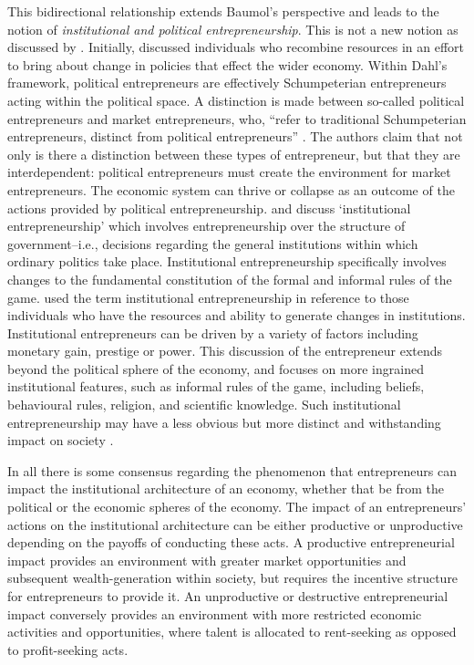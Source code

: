 This bidirectional relationship extends Baumol's perspective and leads to the notion of \emph{institutional and political entrepreneurship}. This is not a new notion as discussed by \citet{BoettkeCoyne2009}. Initially, \citet{Dahl1961} discussed individuals who recombine resources in an effort to bring about change in policies that effect the wider economy. Within Dahl's framework, political entrepreneurs are effectively Schumpeterian entrepreneurs acting within the political space. A distinction is made between so-called political entrepreneurs and market entrepreneurs, who, ``refer to traditional Schumpeterian entrepreneurs, distinct from political entrepreneurs'' \citet[p.~50]{HenreksonSanandaji2011}. The authors claim that not only is there a distinction between these types of entrepreneur, but that they are interdependent: political entrepreneurs must create the environment for market entrepreneurs. The economic system can thrive or collapse as an outcome of the actions provided by political entrepreneurship. \citet{Eisenstadt1980} and \citet{HwangPowell2005} discuss `institutional entrepreneurship' which involves entrepreneurship over the structure of government--i.e., decisions regarding the general institutions within which ordinary politics take place. Institutional entrepreneurship specifically involves changes to the fundamental constitution of the formal and informal rules of the game. \citet{DiMaggio1988} used the term institutional entrepreneurship in reference to those individuals who have the resources and ability to generate changes in institutions. Institutional entrepreneurs can be driven by a variety of factors including monetary gain, prestige or power. This discussion of the entrepreneur extends beyond the political sphere of the economy, and focuses on more ingrained institutional features, such as informal rules of the game, including beliefs, behavioural rules, religion, and scientific knowledge. Such institutional entrepreneurship may have a less obvious but more distinct and withstanding impact on society \citep{Abrutyn2013}.

In all there is some consensus regarding the phenomenon that entrepreneurs can impact the institutional architecture of an economy, whether that be from the political or the economic spheres of the economy. The impact of an entrepreneurs' actions on the institutional architecture can be either productive or unproductive depending on the payoffs of conducting these acts. A productive entrepreneurial impact provides an environment with greater market opportunities and subsequent wealth-generation within society, but requires the incentive structure for entrepreneurs to provide it. An unproductive or destructive entrepreneurial impact conversely provides an environment with more restricted economic activities and opportunities, where talent is allocated to rent-seeking as opposed to profit-seeking acts.

